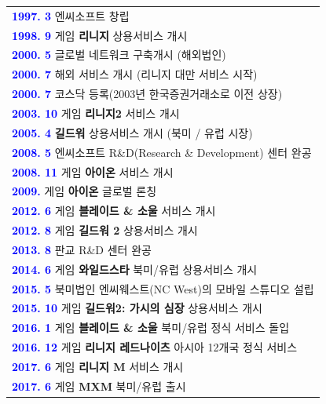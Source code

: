 \documentclass[11pt]{oblivoir}
\newenvironment{textbox}
	{
	\begin{center}
		\begin{tabular}{|p{0.95\textwidth}|}
			\hline
	}
	{
		\\ \hline
		\end{tabular}
		\end{center}
	}
\begin{document}
			\begin{textbox}
			\textbf{\textcolor{blue}{1997. 3}} 엔씨소프트 창립
			\\
			\textbf{\textcolor{blue}{1998. 9}} 게임  \textbf{리니지} 상용서비스 개시
			\\
			\textbf{\textcolor{blue}{2000. 5}} 글로벌 네트워크 구축개시 (해외법인)
			\\
			\textbf{\textcolor{blue}{2000. 7}} 해외 서비스 개시 (리니지 대만 서비스 시작)
			\\
			\textbf{\textcolor{blue}{2000. 7}} 코스닥 등록(2003년 한국증권거래소로 이전 상장)
			\\
			\textbf{\textcolor{blue}{2003. 10}} 게임 \textbf{리니지2} 서비스 개시
			\\
			\textbf{\textcolor{blue}{2005. 4}} \textbf{길드워} 상용서비스 개시 (북미 / 유럽 시장)
			\\
			\textbf{\textcolor{blue}{2008. 5}} 엔씨소프트 R\&D(Research \& Development) 센터 완공
			\\
			\textbf{\textcolor{blue}{2008. 11}} 게임 \textbf{아이온} 서비스 개시
			\\
			\textbf{\textcolor{blue}{2009.}} 게임 \textbf{아이온} 글로벌 론칭
			\\
			\textbf{\textcolor{blue}{2012. 6}} 게임 \textbf{블레이드 \& 소울} 서비스 개시
			\\
			\textbf{\textcolor{blue}{2012. 8}} 게임 \textbf{길드워 2} 상용서비스 개시
			\\
			\textbf{\textcolor{blue}{2013. 8}} 판교 R\&D 센터 완공
			\\
			\textbf{\textcolor{blue}{2014. 6}} 게임 \textbf{와일드스타} 북미/유럽 상용서비스 개시
			\\
			\textbf{\textcolor{blue}{2015. 5}} 북미법인 엔씨웨스트(NC West)의 모바일 스튜디오 설립
			\\
			\textbf{\textcolor{blue}{2015. 10}} 게임 \textbf{길드워2: 가시의 심장} 상용서비스 개시
			\\
			\textbf{\textcolor{blue}{2016. 1}} 게임 \textbf{블레이드 \& 소울} 북미/유럽 정식 서비스 돌입
			\\
			\textbf{\textcolor{blue}{2016. 12}} 게임 \textbf{리니지 레드나이츠} 아시아 12개국 정식 서비스
			\\
			\textbf{\textcolor{blue}{2017. 6}} 게임 \textbf{리니지 M} 서비스 개시
			\\
			\textbf{\textcolor{blue}{2017. 6}} 게임 \textbf{MXM} 북미/유럽 출시
		\end{textbox}
		\pagebreak
\end{document}
